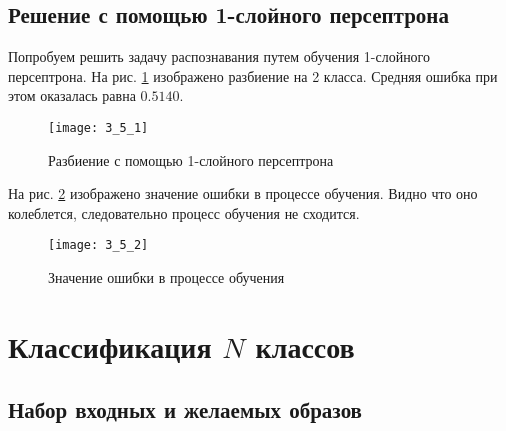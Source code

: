 \subsection{Решение с помощью 1-слойного персептрона}


Попробуем решить задачу распознавания путем обучения 1-слойного персептрона. На рис. \ref{fig:3_5_1} изображено разбиение на 2 класса. Средняя ошибка при этом оказалась равна $0.5140$.

\begin{figure}[H]
\begin{center}
	\texttt{[image: 3\_5\_1]}
	\caption{Разбиение с помощью 1-слойного персептрона}
	\label{fig:3_5_1}
\end{center}
\end{figure}
\vspace{-0.5cm}

На рис. \ref{fig:3_5_2} изображено значение ошибки в процессе обучения. Видно что оно колеблется, следовательно процесс обучения не сходится.

\vspace{-0.5cm}
\begin{figure}[H]
\begin{center}
	\texttt{[image: 3\_5\_2]}
	\caption{Значение ошибки в процессе обучения}
	\label{fig:3_5_2}
\end{center}
\end{figure}



\section{Классификация $N$ классов}

\subsection{Набор входных и желаемых образов}

